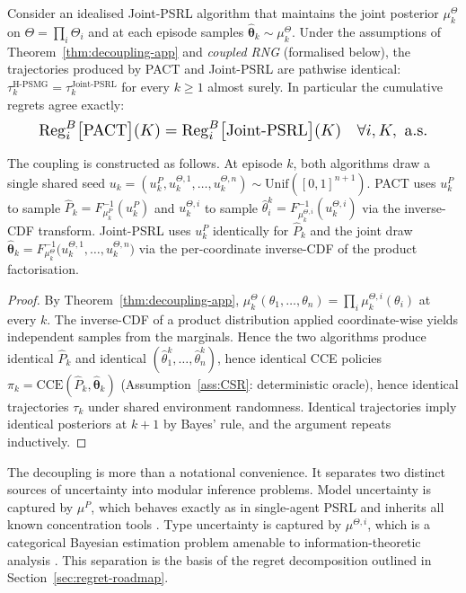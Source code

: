\begin{proposition}
\label{prop:bit-identical}
Consider an idealised Joint-PSRL algorithm that maintains the joint posterior $\mu_k^\Theta$ on $\Theta = \prod_i \Theta_i$ and at each episode samples $\hat{\boldsymbol\theta}_k \sim \mu_k^\Theta$. Under the assumptions of Theorem~\ref{thm:decoupling-app} and \emph{coupled RNG} (formalised below), the trajectories produced by PACT and Joint-PSRL are pathwise identical: $\tau_k^{\mathrm{H\text{-}PSMG}} = \tau_k^{\mathrm{Joint\text{-}PSRL}}$ for every $k \geq 1$ almost surely. In particular the cumulative regrets agree exactly:
\begin{equation}\resizebox{0.9\linewidth}{!}{$\displaystyle \mathrm{Reg}_i^B\big[\textnormal{PACT}\big](K) = \mathrm{Reg}_i^B\big[\textnormal{Joint-PSRL}\big](K) \quad \forall i, K, \text{ a.s.} $}\end{equation}

The coupling is constructed as follows. At episode $k$, both algorithms draw a single shared seed $u_k = (u_k^P, u_k^{\Theta, 1}, \ldots, u_k^{\Theta, n}) \sim \mathrm{Unif}([0,1]^{n+1})$. PACT uses $u_k^P$ to sample $\hat P_k = F_{\mu_k^P}^{-1}(u_k^P)$ and $u_k^{\Theta, i}$ to sample $\hat\theta_i^k = F_{\mu_k^{\Theta, i}}^{-1}(u_k^{\Theta, i})$ via the inverse-CDF transform. Joint-PSRL uses $u_k^P$ identically for $\hat P_k$ and the joint draw $\hat{\boldsymbol\theta}_k = F_{\mu_k^\Theta}^{-1}\big(u_k^{\Theta, 1}, \ldots, u_k^{\Theta, n}\big)$ via the per-coordinate inverse-CDF of the product factorisation.
\end{proposition}

\begin{proof}
By Theorem~\ref{thm:decoupling-app}, $\mu_k^\Theta(\theta_1, \ldots, \theta_n) = \prod_i \mu_k^{\Theta, i}(\theta_i)$ at every $k$. The inverse-CDF of a product distribution applied coordinate-wise yields independent samples from the marginals. Hence the two algorithms produce identical $\hat P_k$ and identical $(\hat\theta_1^k, \ldots, \hat\theta_n^k)$, hence identical CCE policies $\pi_k = \mathrm{CCE}(\hat P_k, \hat{\boldsymbol\theta}_k)$ (Assumption~\ref{ass:CSR}: deterministic oracle), hence identical trajectories $\tau_k$ under shared environment randomness. Identical trajectories imply identical posteriors at $k+1$ by Bayes' rule, and the argument repeats inductively.
\end{proof}

\begin{remark}
The decoupling is more than a notational convenience. It separates two distinct sources of uncertainty into modular inference problems. Model uncertainty is captured by $\mu^P$, which behaves exactly as in single-agent PSRL and inherits all known concentration tools \citep{agrawal2017optimistic}. Type uncertainty is captured by $\mu^{\Theta,i}$, which is a categorical Bayesian estimation problem amenable to information-theoretic analysis \citep{russo2014learning}. This separation is the basis of the regret decomposition outlined in Section~\ref{sec:regret-roadmap}.
\end{remark}

